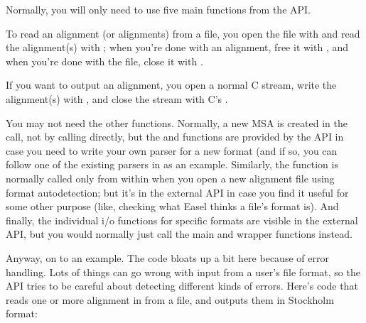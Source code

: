 Normally, you will only need to use five main functions from the API.

To read an alignment (or alignments) from a file, you open the file
with  and read the alignment(s) with
; when you're done with an alignment, free it
with , and when you're done with the file,
close it with . 

If you want to output an alignment, you open a normal C 
stream, write the alignment(s) with , and
close the stream with C's .

You may not need the other functions.  Normally, a new MSA is created
in the  call, not by calling
 directly, but the  and
 functions are provided by the API in case you need
to write your own parser for a new format (and if so, you can follow
one of the existing parsers in  as an example. Similarly,
the  function is normally called
only from within  when you open a new
alignment file using format autodetection; but it's in the external
API in case you find it useful for some other purpose (like, checking
what Easel thinks a file's format is). And finally, the individual i/o
functions for specific formats are visible in the external API, but
you would normally just call the main  and
 wrapper functions instead.

Anyway, on to an example. The code bloats up a bit here because of
error handling. Lots of things can go wrong with input from a user's
file format, so the API tries to be careful about detecting different
kinds of errors. Here's code that reads one or more alignment in from
a file, and outputs them in Stockholm format:


